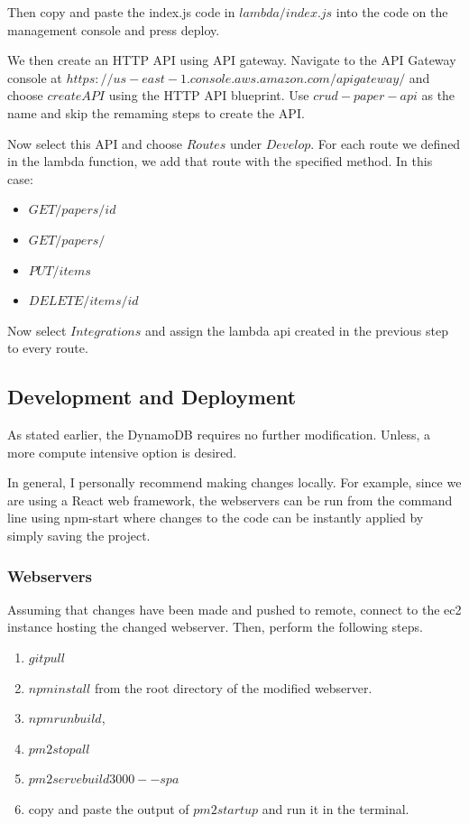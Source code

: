 \documentclass[12pt]{article}
\begin{document}
Then copy and paste the index.js code in $lambda/index.js$ into the code on the management console and press deploy.

We then create an HTTP API using API gateway. Navigate to the API Gateway console at $https://us-east-1.console.aws.amazon.com/apigateway/$ and choose $create API$ using the HTTP API blueprint. Use $crud-paper-api$ as the name and skip the remaming steps to create the API. 

Now select this API and choose $Routes$ under $Develop$. For each route we defined in the lambda function, we add that route with the specified method. In this case: 

\begin{itemize}
    \item $GET /papers/{id} $
    \item $GET /papers/$
    \item $PUT /items$
    \item $DELETE /items/{id}$
\end{itemize}

Now select $Integrations$ and assign the lambda api created in the previous step to every route.

\subsection{Development and Deployment}

As stated earlier, the DynamoDB requires no further modification. Unless, a more compute intensive option is desired.

In general, I personally recommend making changes locally. For example, since we are using a React web framework, the webservers can be run from the command line using npm-start where changes to the code can be instantly applied by simply saving the project. 

\subsubsection{Webservers}

Assuming that changes have been made and pushed to remote, connect to the ec2 instance hosting the changed webserver. Then, perform the following steps.

\begin{enumerate}
    \item $git pull$
    \item $npm install$ from the root directory of the modified webserver.
    \item $npm run build$,
    \item $pm2 stop all$
    \item $pm2 serve build 3000 --spa$ 
    \item copy and paste the output of $pm2 startup$ and run it in the terminal.
\end{enumerate}
\end{document}
